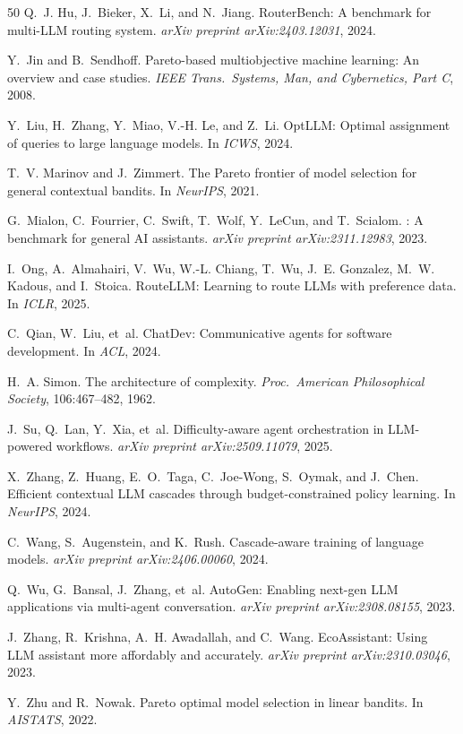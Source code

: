 \documentclass{article}
\begin{document}
\begin{thebibliography}{50}
Q.~J. Hu, J.~Bieker, X.~Li, and N.~Jiang.
\newblock Router{B}ench: A benchmark for multi-{LLM} routing system.
\newblock \emph{arXiv preprint arXiv:2403.12031}, 2024.

Y.~Jin and B.~Sendhoff.
\newblock Pareto-based multiobjective machine learning: An overview and case studies.
\newblock \emph{IEEE Trans.\ Systems, Man, and Cybernetics, Part C}, 2008.

Y.~Liu, H.~Zhang, Y.~Miao, V.-H. Le, and Z.~Li.
\newblock Opt{LLM}: Optimal assignment of queries to large language models.
\newblock In \emph{ICWS}, 2024.

T.~V. Marinov and J.~Zimmert.
\newblock The {P}areto frontier of model selection for general contextual bandits.
\newblock In \emph{NeurIPS}, 2021.

G.~Mialon, C.~Fourrier, C.~Swift, T.~Wolf, Y.~LeCun, and T.~Scialom.
: A benchmark for general {AI} assistants.
\newblock \emph{arXiv preprint arXiv:2311.12983}, 2023.

I.~Ong, A.~Almahairi, V.~Wu, W.-L. Chiang, T.~Wu, J.~E. Gonzalez, M.~W. Kadous, and I.~Stoica.
\newblock Route{LLM}: Learning to route {LLMs} with preference data.
\newblock In \emph{ICLR}, 2025.

C.~Qian, W.~Liu, et~al.
\newblock Chat{D}ev: Communicative agents for software development.
\newblock In \emph{ACL}, 2024.

H.~A. Simon.
\newblock The architecture of complexity.
\newblock \emph{Proc.\ American Philosophical Society}, 106:467--482, 1962.

J.~Su, Q.~Lan, Y.~Xia, et~al.
\newblock Difficulty-aware agent orchestration in {LLM}-powered workflows.
\newblock \emph{arXiv preprint arXiv:2509.11079}, 2025.

X.~Zhang, Z.~Huang, E.~O.~Taga, C.~Joe-Wong, S.~Oymak, and J.~Chen.
\newblock Efficient contextual {LLM} cascades through budget-constrained policy learning.
\newblock In \emph{NeurIPS}, 2024.

C.~Wang, S.~Augenstein, and K.~Rush.
\newblock Cascade-aware training of language models.
\newblock \emph{arXiv preprint arXiv:2406.00060}, 2024.

Q.~Wu, G.~Bansal, J.~Zhang, et~al.
\newblock Auto{G}en: Enabling next-gen {LLM} applications via multi-agent conversation.
\newblock \emph{arXiv preprint arXiv:2308.08155}, 2023.

J.~Zhang, R.~Krishna, A.~H. Awadallah, and C.~Wang.
\newblock Eco{A}ssistant: Using {LLM} assistant more affordably and accurately.
\newblock \emph{arXiv preprint arXiv:2310.03046}, 2023.

Y.~Zhu and R.~Nowak.
\newblock Pareto optimal model selection in linear bandits.
\newblock In \emph{AISTATS}, 2022.

\end{thebibliography}
\end{document}
